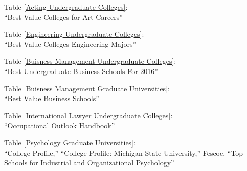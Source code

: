 \newpage 
{}
\begin{tablescited} 
\begin{flushleft}
\linespread{1.5}

Table \ref{Acting Undergraduate Colleges}: \\
\bibent
“Best Value Colleges for Art Careers” \\ \vspace{3mm}

Table \ref{Engineering Undergraduate Colleges}: \\
\bibent
“Best Value Colleges Engineering Majors” \\ \vspace{3mm}

Table \ref{Buisness Management Undergraduate Colleges}: \\
\bibent
“Best Undergraduate Business Schools For 2016” \\ \vspace{3mm}

Table \ref{Buisness Management Graduate Universities}: \\
\bibent
“Best Value Business Schools” \\ \vspace{3mm}

Table \ref{International Lawyer Undergraduate Colleges}: \\
\bibent
“Occupational Outlook Handbook” \\ \vspace{3mm}

Table \ref{Psychology Graduate Universities}: \\
\bibent
“College Profile,” “College Profile: Michigan State University,” Fescoe, “Top Schools for Industrial and Organizational Psychology” \\ \vspace{3mm}

\end{flushleft}
\end{tablescited} 